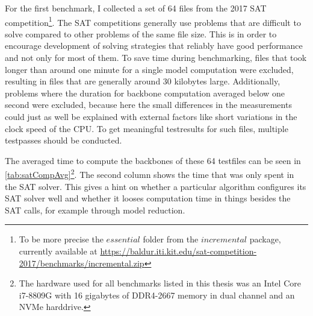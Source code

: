 For the first benchmark, I collected a set of 64 files from the 2017 SAT competition\footnote{
To be more precise the $essential$ folder from the $incremental$ package, currently available at \url{https://baldur.iti.kit.edu/sat-competition-2017/benchmarks/incremental.zip}
}. The SAT competitions generally use problems that are difficult to solve compared to other problems of the same file size. This is in order to encourage development of solving strategies that reliably have good performance and not only for most of them. To save time during benchmarking, files that took longer than around one minute for a single model computation were excluded, resulting in files that are generally around 30 kilobytes large. Additionally, problems where the duration for backbone computation averaged below one second were excluded, because here the small differences in the measurements could just as well be explained with external factors like short variations in the clock speed of the CPU. To get meaningful testresults for such files, multiple testpasses should be conducted.

The averaged time to compute the backbones of these 64 testfiles can be seen in \ref{tab:satCompAvg}\footnote{
	The hardware used for all benchmarks listed in this thesis was an Intel Core i7-8809G with 16 gigabytes of DDR4-2667 memory in dual channel and an NVMe harddrive. 
}. The second column shows the time that was only spent in the SAT solver. This gives a hint on whether a particular algorithm configures its SAT solver well and whether it looses computation time in things besides the SAT calls, for example through model reduction.


